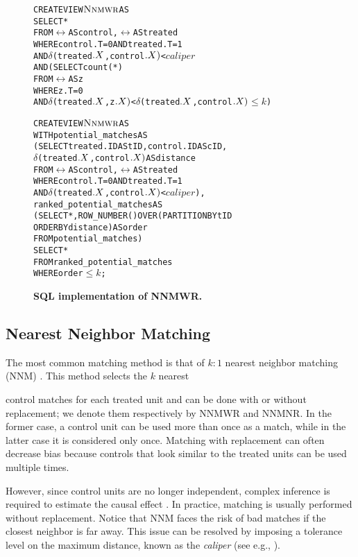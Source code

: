 \begin{figure}
  \centering
\begin{alltt} \scriptsize
CREATE VIEW \(\nnmwr\) AS
SELECT *
   FROM \(\rel\) AS control,\(\rel\) AS treated
WHERE control.T=0  AND treated.T=1
  AND \(\delta\)(treated\(.\cv\),control\(.\cv)\) < \(caliper\)
  AND (SELECT count(*)
     FROM \(\rel\) AS z
     WHERE z.T=0
       AND \(\delta\)(treated\(.\cv\),z\(.\cv)\) < \(\delta\)(treated\(.\cv\),control\(.\cv)\) \(\leq k\))
\end{alltt} \vspace{-.5cm}
\vspace{-.4cm}
\begin{alltt} \scriptsize
CREATE VIEW \(\nnmwr\) AS
WITH potential_matches AS
  (SELECT treated.ID AS tID,control.ID AS cID,
         \(\delta\)(treated\(.\cv\),control\(.\cv)\)  AS distance
   FROM \(\rel\) AS control, \(\rel\) AS treated
   WHERE control.T=0 AND treated.T=1
     AND \(\delta\)(treated\(.\cv\),control\(.\cv)\) < \(caliper\)),
      ranked_potential_matches AS
  (SELECT *, ROW_NUMBER() OVER (PARTITION BY tID
                       ORDER BY distance) AS order
   FROM potential_matches)
SELECT *
FROM ranked_potential_matches
WHERE order \(\leq k\);
\end{alltt}
\vspace{-.5cm}
  \caption{\bf SQL implementation of NNMWR.}\label{fig:nnmwr}
\end{figure}
\vspace{-.35cm}
\newpage

\subsection{Nearest Neighbor Matching}
\label{sec:nnm}
The most common matching method is that of $k:1$ nearest neighbor
matching (NNM) \cite{Rubin1983b,ho2005,Stuart10}. This method selects
the $k$ nearest  control matches for each treated
unit and can be done with or without replacement; we denote
them respectively by NNMWR and NNMNR.  In the former case, a control
unit can be used more than once as a match, while in the latter case
it is considered only once. Matching with replacement can often
decrease bias because controls that look similar to the treated units
can be used multiple times.   However, since control units
are no longer independent, complex inference is required to estimate
the causal effect \cite{dehejia99}. In practice, matching is usually
performed without replacement.  Notice that NNM faces the risk of bad
matches if the closest neighbor is far away. This issue can be
resolved by imposing a tolerance level on the maximum distance, known
as the {\em caliper} (see e.g., \cite{lunt2014selecting}). 



